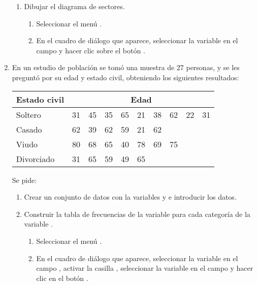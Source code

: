 \begin{enumerate}[leftmargin=*]
\begin{enumerate}
\item Dibujar el diagrama de sectores.
\begin{indicacion}
\begin{enumerate}
\item Seleccionar el menú .
\item En el cuadro de diálogo que aparece, seleccionar la variable  en el campo
 y hacer clic sobre el botón .
\end{enumerate}
\end{indicacion}
\end{enumerate}

\item  En un estudio de población se tomó una muestra de 27 personas, y se les preguntó por su edad y estado civil,
obteniendo los siguientes resultados:
\begin{center}
\begin{tabular}{|l|rrrrrrrrr|}
\hline
Estado civil & \multicolumn{9}{c|}{Edad}\\
\hline
Soltero    & 31 & 45 & 35 & 65 & 21 & 38 & 62 & 22 & 31 \\
Casado     & 62 & 39 & 62 & 59 & 21 & 62 &    &    &    \\
Viudo      & 80 & 68 & 65 & 40 & 78 & 69 & 75 &    &    \\
Divorciado & 31 & 65 & 59 & 49 & 65 &    &    &    &    \\
\hline
\end{tabular}
\end{center}

Se pide:
\begin{enumerate}
\item Crear un conjunto de datos con la variables  y  e introducir los datos.
\item Construir la tabla de frecuencias de la variable  para cada categoría de la
variable .
\begin{indicacion}
\begin{enumerate}
\item Seleccionar el menú .
\item En el cuadro de diálogo que aparece, seleccionar la variable  en el campo , activar la casilla , seleccionar la variable  en el campo
 y hacer clic en el botón .
\end{enumerate}
\end{indicacion}


\end{enumerate}
\end{enumerate}
